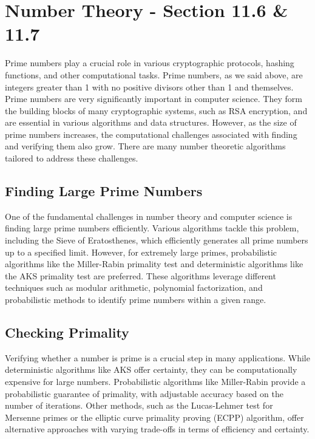 \documentclass{article}
\renewcommand{\_}{\ifincsname_\else\legacyunderscore\fi}
\begin{document}
\newpage

\section{Number Theory - Section 11.6 \& 11.7}
Prime numbers play a crucial role in various cryptographic protocols, hashing functions, and other computational tasks.
Prime numbers, as we said above, are integers greater than 1 with no positive divisors other than 1 and themselves. Prime numbers are very significantly important in computer science. They form the building blocks of many cryptographic systems, such as RSA encryption, and are essential in various algorithms and data structures. However, as the size of prime numbers increases, the computational challenges associated with finding and verifying them also grow. There are many number theoretic algorithms tailored to address these challenges.

\subsection{Finding Large Prime Numbers}
One of the fundamental challenges in number theory and computer science is finding large prime numbers efficiently. Various algorithms tackle this problem, including the Sieve of Eratosthenes, which efficiently generates all prime numbers up to a specified limit. However, for extremely large primes, probabilistic algorithms like the Miller-Rabin primality test and deterministic algorithms like the AKS primality test are preferred. These algorithms leverage different techniques such as modular arithmetic, polynomial factorization, and probabilistic methods to identify prime numbers within a given range.

\subsection{Checking Primality}
Verifying whether a number is prime is a crucial step in many applications. While deterministic algorithms like AKS offer certainty, they can be computationally expensive for large numbers. Probabilistic algorithms like Miller-Rabin provide a probabilistic guarantee of primality, with adjustable accuracy based on the number of iterations. Other methods, such as the Lucas-Lehmer test for Mersenne primes or the elliptic curve primality proving (ECPP) algorithm, offer alternative approaches with varying trade-offs in terms of efficiency and certainty.
\end{document}
